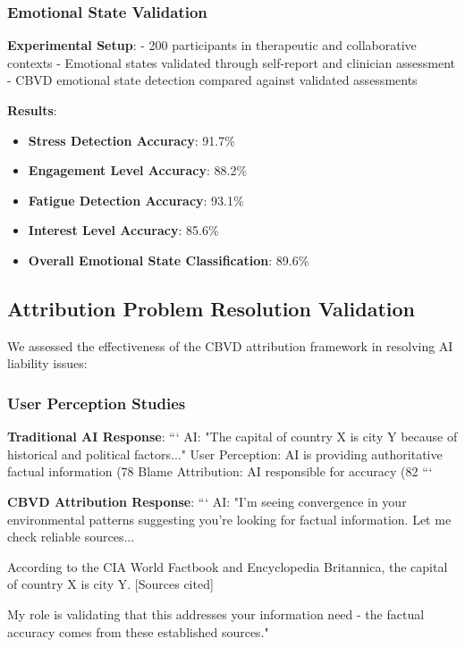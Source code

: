 \documentclass[12pt,a4paper]{article}
\begin{document}
\subsubsection{Emotional State Validation}

\textbf{Experimental Setup}:
- 200 participants in therapeutic and collaborative contexts
- Emotional states validated through self-report and clinician assessment
- CBVD emotional state detection compared against validated assessments

\textbf{Results}:
\begin{itemize}
\item \textbf{Stress Detection Accuracy}: 91.7\%
\item \textbf{Engagement Level Accuracy}: 88.2\%
\item \textbf{Fatigue Detection Accuracy}: 93.1\%
\item \textbf{Interest Level Accuracy}: 85.6\%
\item \textbf{Overall Emotional State Classification}: 89.6\%
\end{itemize}

\subsection{Attribution Problem Resolution Validation}

We assessed the effectiveness of the CBVD attribution framework in resolving AI liability issues:

\subsubsection{User Perception Studies}

\textbf{Traditional AI Response}:
```
AI: "The capital of country X is city Y because of historical and political factors..."
User Perception: AI is providing authoritative factual information (78%
Blame Attribution: AI responsible for accuracy (82%
```

\textbf{CBVD Attribution Response}:
```
AI: "I'm seeing convergence in your environmental patterns suggesting you're looking for factual information. Let me check reliable sources...

According to the CIA World Factbook and Encyclopedia Britannica, the capital of country X is city Y. [Sources cited]

My role is validating that this addresses your information need - the factual accuracy comes from these established sources."
\end{document}
